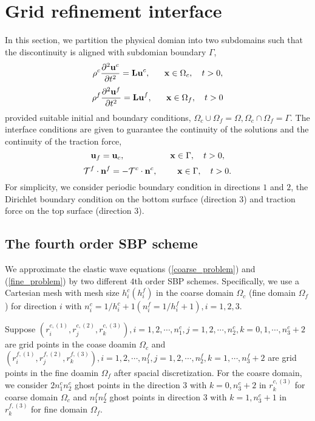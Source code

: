 \documentclass[a4paper]{article}
\begin{document}
\section{Grid refinement interface}
In this section, we partition the physical domian into two subdomains such that the discontinuity is aligned with subdomian boundary $\Gamma$,
\begin{equation}\label{coarse_problem}
\rho^c\frac{\partial ^2 {\bf u}^c}{\partial t^2} = {\bf Lu}^c, \ \ \ \ \ {\bf x} \in \Omega_c,\ \ \ t>0,
\end{equation}
\begin{equation}\label{fine_problem}
\rho^f\frac{\partial ^2 {\bf u}^f}{\partial t^2} = {\bf Lu}^f, \ \ \ \ \ {\bf x} \in \Omega_f,\ \ \ t>0
\end{equation}
provided suitable initial and boundary conditions, $\Omega_c\cup\Omega_f = \Omega, \Omega_c\cap\Omega_f = \Gamma$. The interface conditions are given to guarantee the continuity of the solutions and the continuity of the traction force,
\begin{equation}\label{continuity_sol}
{\bf u}_f = {\bf u}_c, \ \ \ \ \ \ \ \ \ \ \ \ \ \ \ \ {\bf x}\in \Gamma, \ \ \ t>0, 
\end{equation}
\begin{equation}\label{continuity_trac}
\mathcal{T}^f\cdot{\bf n}^f = -\mathcal{T}^c\cdot{\bf n}^c,  \ \ \ \ \ \ \  {\bf x}\in \Gamma, \ \ \ t>0.
\end{equation}
For simplicity, we consider periodic boundary condition in directions $1$ and $2$, the Dirichlet boundary condition on the bottom surface (direction $3$) and traction force on the top surface (direction $3$).

\subsection{The fourth order SBP scheme}\label{sub_section_4_1}
We approximate the elastic wave equations (\ref{coarse_problem}) and (\ref{fine_problem}) by two different $4$th order SBP schemes. Specifically, we use a Cartesian mesh with mesh size $h_i^c (h_i^f)$ in the coarse domain $\Omega_c$ (fine domain $\Omega_f$) for direction $i$ with $n_i^c = 1/h_i^c +1 (n_i^f = 1/h_i^f +1), i = 1,2,3$.

Suppose $(r^{c,(1)}_i, r^{c,(2)}_j, r^{c,(3)}_k), i = 1,2,\cdots,n_1^c, j = 1,2,\cdots,n_2^c,k=0,1,\cdots,n_3^c+2$ are grid points in the coase doamin $\Omega_c$ and   $(r^{f,(1)}_i, r^{f,(2)}_j, r^{f,(3)}_k), i = 1,2,\cdots,n_1^f, j = 1,2,\cdots,n_2^f,k=1,\cdots,n_3^f+2$ are grid points in the fine doamin $\Omega_f$ after spacial discretization. For the coasre domain, we consider $2n^c_1n^c_2$ ghost points in the direction $3$ with $k = 0, n_3^c+2$ in $r^{c,(3)}_k$ for coarse domain $\Omega_c$ and $n^f_1n^f_2$ ghost points in direction $3$ with $k = 1,n_3^c+1$ in $r^{f,(3)}_k$ for fine domain $\Omega_f$.
\end{document}
